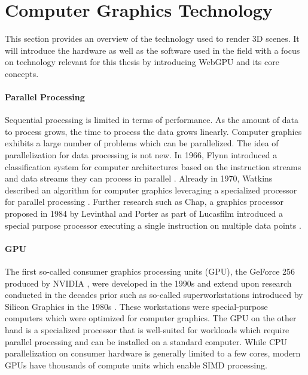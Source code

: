 \section{Computer Graphics Technology}

This section provides an overview of the technology used to render 3D scenes. It will introduce the hardware as well as the software used in the field with a focus on technology relevant for this thesis by introducing WebGPU and its core concepts.

\paragraph{Parallel Processing}

Sequential processing is limited in terms of performance. As the amount of data to process grows, the time to process the data grows linearly. Computer graphics exhibits a large number of problems which can be parallelized. The idea of parallelization for data processing is not new. In 1966, Flynn introduced a classification system for computer architectures based on the instruction streams and data streams they can process in parallel \cite{flynnTaxonomy,flynnTaxonomy2}. Already in 1970, Watkins described an algorithm for computer graphics leveraging a specialized processor for parallel processing \cite{surfaceAlgorithmProcessor}. Further research such as Chap, a  graphics processor proposed in 1984 by Levinthal and Porter as part of Lucasfilm introduced a special purpose processor executing a single instruction on multiple data points \cite{chapSIMDgpu}.

\paragraph{GPU}

The first so-called consumer graphics processing units (\gls{GPU}), the GeForce 256 produced by NVIDIA \cite{evolutionOfGPU}, were developed in the 1990s and extend upon research conducted in the decades prior such as so-called superworkstations introduced by Silicon Graphics in the 1980s \cite{sigWorkstation}. These workstations were special-purpose computers which were optimized for computer graphics. The \gls{GPU} on the other hand is a specialized processor that is well-suited for workloads which require parallel processing and can be installed on a standard computer. While \gls{CPU} parallelization on consumer hardware is generally limited to a few cores, modern \glspl{GPU} have thousands of compute units which enable \gls{SIMD} processing.

